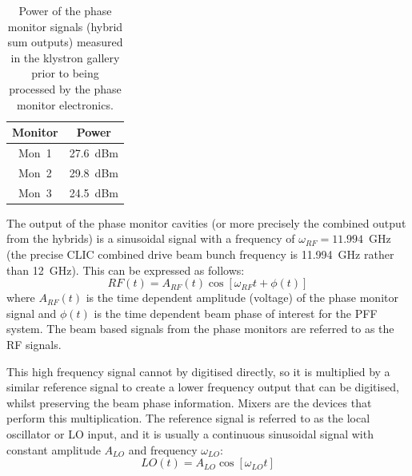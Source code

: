 \begin{table}
  \begin{center}
    \begin{tabular}{|c c|}
	   \hline
       Monitor & Power \\ \hline
       Mon~1 & 27.6~dBm \\
       Mon~2 & 29.8~dBm \\
       Mon~3 & 24.5~dBm \\ \hline
    \end{tabular}
    \caption{Power of the phase monitor signals (hybrid sum outputs) measured in the klystron gallery prior to being processed by the phase monitor electronics.}
  	\label{t:monPowers}
  \end{center}
\end{table}






The output of the phase monitor cavities (or more precisely the combined output from the hybrids) is a sinusoidal signal with a frequency of \(\omega_{RF} = 11.994\)~GHz (the precise CLIC combined drive beam bunch frequency is 11.994~GHz rather than 12~GHz). This can be expressed as follows:
\begin{equation}
RF(t) = A_{RF}(t)\cos[\omega_{RF} t + \phi(t)]
\end{equation}
where \(A_{RF}(t)\) is the time dependent amplitude (voltage) of the phase monitor signal and \(\phi(t)\) is the time dependent beam phase of interest for the PFF system. The beam based signals from the phase monitors are referred to as the RF signals.

This high frequency signal cannot by digitised directly, so it is multiplied by a similar reference signal to create a lower frequency output that can be digitised, whilst preserving the beam phase information. Mixers are the devices that perform this multiplication. The reference signal is referred to as the local oscillator or LO input, and it is usually a continuous sinusoidal signal with constant amplitude \(A_{LO}\) and frequency \(\omega_{LO}\):
\begin{equation}
LO(t) = A_{LO}\cos[\omega_{LO} t]
\end{equation}


